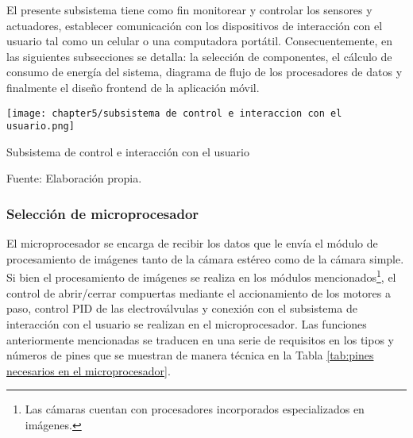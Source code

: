 El presente subsistema tiene como fin monitorear y controlar los sensores y actuadores, establecer comunicación con los dispositivos de interacción con el usuario tal como un celular o una computadora portátil. Consecuentemente, en las siguientes subsecciones se detalla: la selección de componentes, el cálculo de consumo de energía del sistema, diagrama de flujo de los procesadores de datos y finalmente el diseño frontend de la aplicación móvil.

\begin{myfigure}[H]
	\footnotesize\centering
	\texttt{[image: chapter5/subsistema de control e interaccion con el usuario.png]}
	\caption{Subsistema de control e interacción con el usuario}
	\begin{myflushcenter}
		Fuente: Elaboración propia.
	\end{myflushcenter}
	\label{fig:subsistema de control e interaccion con el usuario}
\end{myfigure}

\subsubsection{Selección de microprocesador}
\label{sssec:seleccion de microprocesador}

El microprocesador se encarga de recibir los datos que le envía el módulo de procesamiento de imágenes tanto de la cámara estéreo como de la cámara simple. Si bien el procesamiento de imágenes se realiza en los módulos mencionados\footnote{Las cámaras cuentan con procesadores incorporados especializados en imágenes.}, el control de abrir/cerrar compuertas mediante el accionamiento de los motores a paso, control PID de las electroválvulas y conexión con el subsistema de interacción con el usuario se realizan en el microprocesador. Las funciones anteriormente mencionadas se traducen en una serie de requisitos en los tipos y números de pines que se muestran de manera técnica en la Tabla \ref{tab:pines necesarios en el microprocesador}.


